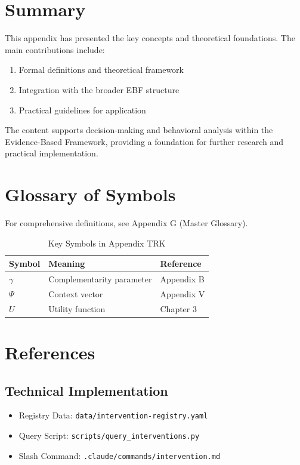 \section{Summary}
\label{sec:trk-summary}

This appendix has presented the key concepts and theoretical foundations.
The main contributions include:

\begin{enumerate}
    \item Formal definitions and theoretical framework
    \item Integration with the broader EBF structure
    \item Practical guidelines for application
\end{enumerate}

The content supports decision-making and behavioral analysis within the
Evidence-Based Framework, providing a foundation for further research
and practical implementation.


\section{Glossary of Symbols}
\label{sec:trk-glossary}

For comprehensive definitions, see Appendix G (Master Glossary).

\begin{table}[htbp]
\centering
\caption{Key Symbols in Appendix TRK}
\begin{tabular}{lll}
\toprule
\textbf{Symbol} & \textbf{Meaning} & \textbf{Reference} \\
\midrule
$\gamma$ & Complementarity parameter & Appendix B \\
$\Psi$ & Context vector & Appendix V \\
$U$ & Utility function & Chapter 3 \\
\bottomrule
\end{tabular}
\end{table}


\section{References}

\subsection{Technical Implementation}
\begin{itemize}
    \item Registry Data: \texttt{data/intervention-registry.yaml}
    \item Query Script: \texttt{scripts/query\_interventions.py}
    \item Slash Command: \texttt{.claude/commands/intervention.md}
\end{itemize}

